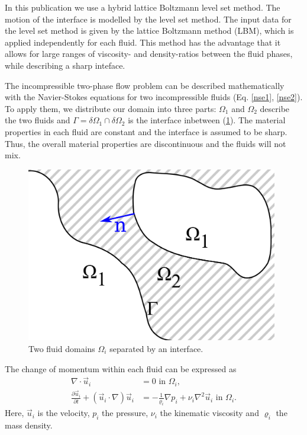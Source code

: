 \documentclass[final,leqno,onefignum,onetabnum]{siamltexmm}
\begin{document}
In this publication we use a hybrid lattice Boltzmann level set method. The motion of the interface is modelled by the level set method. The input data for the level set method is given by the lattice Boltzmann method (LBM), which is applied independently for each fluid. This method has the advantage that it allows for large ranges of viscosity- and density-ratios between the fluid phases, while describing a sharp inteface.

The incompressible two-phase flow problem can be described mathematically with the Navier-Stokes equations for two incompressible fluids (Eq. \ref{nse1}, \ref{nse2}). 
To apply them, we distribute our domain into three parts: $\Omega_1$ and $\Omega_2$ describe the two fluids and $\Gamma = \delta\Omega_1 \cap \delta\Omega_2$ is the interface inbetween (\cref{intro_phases}). The material properties in each fluid are constant and the interface is assumed to be sharp. Thus, the overall material properties are discontinuous and the fluids will not mix.

\begin{figure}[h!]
	\flushright
	\includegraphics[width=11cm,natwidth=1690,natheight=1174]{skizze.png}
	\caption{Two fluid domains $\Omega_i$ separated by an interface.}
	\label{intro_phases}
\end{figure}

The change of momentum within each fluid can be expressed as
\begin{align}
  \nabla \cdot  \vec u_i &= 0 \text{  in } \Omega_i \text{,}
	\label{nse1} \\
	\frac{\partial \vec u_i}{\partial t} + \left(\vec  u_i\cdot \nabla \right) \vec u_i
  &=
	-\frac{1}{\varrho_i}\nabla p_i + \nu_i \nabla^2 \vec u_i \text{  in } \Omega_i \text{.}
	\label{nse2}
\end{align}
Here, $\vec u_i$ is the velocity, $p_i$ the pressure, $\nu_i$ the kinematic viscosity and $\varrho_i$ the mass density.
\end{document}
